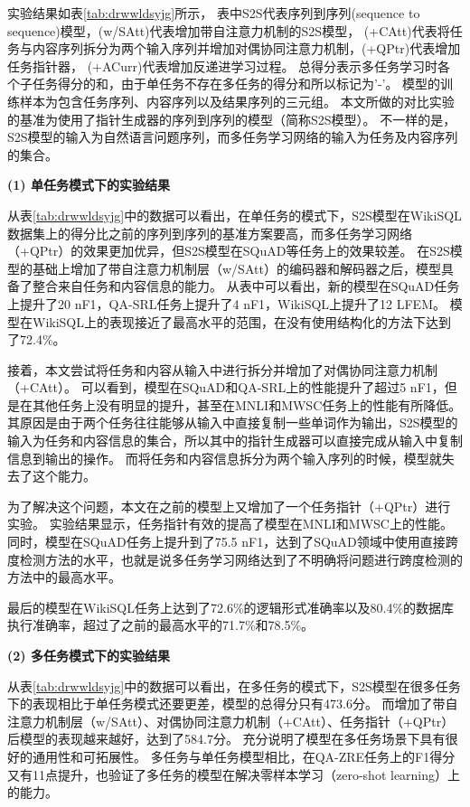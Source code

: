 实验结果如表\ref{tab:drwwldsyjg}所示，
表中S2S代表序列到序列(sequence to sequence)模型，(w/SAtt)代表增加带自注意力机制的S2S模型，
(+CAtt)代表将任务与内容序列拆分为两个输入序列并增加对偶协同注意力机制，(+QPtr)代表增加任务指针器， (+ACurr)代表增加反递进学习过程。
总得分表示多任务学习时各个子任务得分的和，由于单任务不存在多任务的得分和所以标记为’-’。
模型的训练样本为包含任务序列、内容序列以及结果序列的三元组。
本文所做的对比实验的基准为使用了指针生成器的序列到序列的模型（简称S2S模型）\cite{See2017Get}。
不一样的是，S2S模型的输入为自然语言问题序列，而多任务学习网络的输入为任务及内容序列的集合。

\textbf{(1) 单任务模式下的实验结果}

从表\ref{tab:drwwldsyjg}中的数据可以看出，在单任务的模式下，S2S模型在WikiSQL数据集上的得分比之前的序列到序列的基准方案要高，而多任务学习网络（+QPtr）的效果更加优异，但S2S模型在SQuAD等任务上的效果较差。
在S2S模型的基础上增加了带自注意力机制层（w/SAtt）的编码器和解码器之后\cite{vaswani2017attention}，模型具备了整合来自任务和内容信息的能力。
从表中可以看出，新的模型在SQuAD任务上提升了20 nF1，QA-SRL任务上提升了4 nF1，WikiSQL上提升了12 LFEM。
模型在WikiSQL上的表现接近了最高水平的范围，在没有使用结构化的方法\cite{dong2018coarse,huang2018natural,yu2018typesql}下达到了72.4\%。

接着，本文尝试将任务和内容从输入中进行拆分并增加了对偶协同注意力机制（+CAtt）。
可以看到，模型在SQuAD和QA-SRL上的性能提升了超过5 nF1，但是在其他任务上没有明显的提升，甚至在MNLI和MWSC任务上的性能有所降低。
其原因是由于两个任务往往能够从输入中直接复制一些单词作为输出，S2S模型的输入为任务和内容信息的集合，所以其中的指针生成器可以直接完成从输入中复制信息到输出的操作。
而将任务和内容信息拆分为两个输入序列的时候，模型就失去了这个能力。

为了解决这个问题，本文在之前的模型上又增加了一个任务指针（+QPtr）进行实验。
实验结果显示，任务指针有效的提高了模型在MNLI和MWSC上的性能。
同时，模型在SQuAD任务上提升到了75.5 nF1，达到了SQuAD领域中使用直接跨度检测方法的水平，也就是说多任务学习网络达到了不明确将问题进行跨度检测的方法中的最高水平。

最后的模型在WikiSQL任务上达到了72.6\%的逻辑形式准确率以及80.4\%的数据库执行准确率，超过了之前的最高水平\cite{dong2018coarse}的71.7\%和78.5\%。

\textbf{(2) 多任务模式下的实验结果}

从表\ref{tab:drwwldsyjg}中的数据可以看出，在多任务的模式下，S2S模型在很多任务下的表现相比于单任务模式还要更差，模型的总得分只有473.6分。
而增加了带自注意力机制层（w/SAtt）、对偶协同注意力机制（+CAtt）、任务指针（+QPtr）后模型的表现越来越好，达到了584.7分。
充分说明了模型在多任务场景下具有很好的通用性和可拓展性。
多任务与单任务模型相比，在QA-ZRE任务上的F1得分又有11点提升，也验证了多任务的模型在解决零样本学习（zero-shot learning）上的能力。

